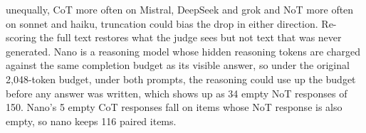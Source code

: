 unequally, CoT more often on Mistral, DeepSeek and grok and NoT more often on
sonnet and haiku, truncation could bias the drop in either direction.
Re-scoring the full text restores what the judge sees but not text that was
never generated. Nano is a reasoning model whose hidden reasoning tokens are
charged against the same completion budget as its visible answer, so under
the original 2,048-token budget, under both prompts, the reasoning could use
up the budget before any answer was written, which shows up as 34 empty NoT
responses of 150.
Nano's 5 empty CoT responses fall on items whose NoT response is also empty,
so nano keeps 116 paired items.

